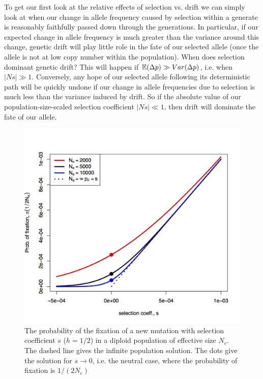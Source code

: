 {To get our first look at the relative effects of selection vs. drift we
can simply look at when our change in allele frequency caused by
selection within a generate is reasonably faithfully passed down through the generations. In particular, if our expected change in allele frequency is much greater than the variance around this change, genetic drift will play little role in the fate of our selected allele (once the allele is not at low copy number within the population). When does selection dominant genetic drift? This will happen if $\mathbb{E}(\Delta p) \gg Var(\Delta p)$, i.e. when $|Ns| \gg 1$. Conversely, any hope of our selected allele following its deterministic path will be quickly undone if our change in allele frequencies due to selection is
much less than the variance induced by drift. So if the absolute value of our population-size-scaled selection coefficient $| Ns| \ll 1$, then drift will dominate the fate of our allele. \\
\begin{figure}
\begin{center}
\includegraphics[width=0.9 \textwidth]{figures/prob_fix_diffusion.png}
\end{center}
\caption{The probability of the fixation of a new mutation with
  selection coefficient $s$ ($h=1/2$) in a diploid population of effective
  size $N_e$. The dashed line gives the infinite population
  solution. The dots give the solution for $s \rightarrow 0$, i.e. the neutral case, where the probability of fixation is $1/(2N_e)$} \label{fig:prob_fix_diffusion}
\end{figure}

}
